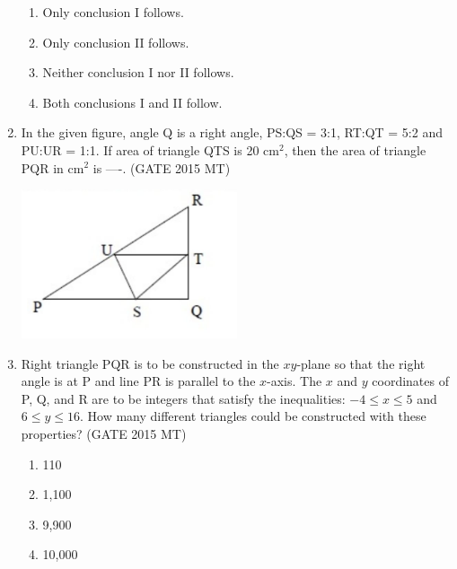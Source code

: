 \documentclass[12pt]{article}
\begin{document}
\begin{enumerate}
\vspace{0.5em}
\begin{enumerate}[label=(\alph*)]
    \item Only conclusion I follows.
    \item Only conclusion II follows.
    \item Neither conclusion I nor II follows.
    \item Both conclusions I and II follow.
\end{enumerate}
\vspace{0.5em}

\item In the given figure, angle Q is a right angle, PS:QS = 3:1, RT:QT = 5:2 and PU:UR = 1:1. If area of triangle QTS is 20 cm$^2$, then the area of triangle PQR in cm$^2$ is ----. (GATE 2015 MT)

\vspace{0.5em}
\begin{center}
    \includegraphics[width=0.5\textwidth]{images/q8i.jpg}
\end{center}
\vspace{0.5em}

\item Right triangle PQR is to be constructed in the $xy$-plane so that the right angle is at P and line PR is parallel to the $x$-axis. The $x$ and $y$ coordinates of P, Q, and R are to be integers that satisfy the inequalities: $-4\leq x \leq 5$ and $6 \leq y \leq 16$. How many different triangles could be constructed with these properties? (GATE 2015 MT)

\vspace{0.5em}
\begin{enumerate}[label=(\alph*)]
    \item 110
    \item 1,100
    \item 9,900
    \item 10,000
\end{enumerate}
\vspace{0.5em}


\end{enumerate}
\end{document}
